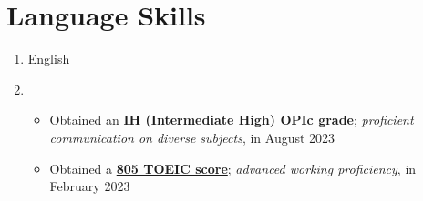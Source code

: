 \documentclass[letterpaper,11pt]{article}
\begin{document}
    \section{Language Skills}    
    \begin{enumerate}[noitemsep, leftmargin=*,label=]
        \item{English}
        \item{
            \begin{itemize}[label=\bullet]
                \item{Obtained an \textbf{\href{https://oneonlee.github.io/my/certificate/OPIc_Score_Report.pdf}{IH (Intermediate High) OPIc grade}}; \textit{proficient communication on diverse subjects}, in August 2023}
                \item{Obtained a \textbf{\href{https://oneonlee.github.io/my/certificate/TOEIC_OFFICIAL_SCORE_CERTIFICATE.pdf}{805 TOEIC score}}; \textit{advanced working proficiency}, in February 2023}
            \end{itemize}
        }
    \end{enumerate}
\end{document}
